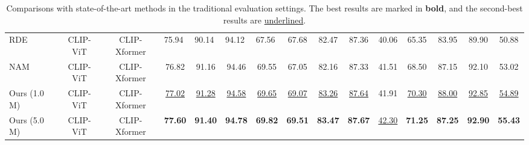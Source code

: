 \begin{table}[t!]
{\begin{tabular}{l|cc|cccc|cccc|cccc}
\multicolumn{1}{l|}{RDE \cite{qin2024noisy}} & CLIP-ViT & \multicolumn{1}{c|}{CLIP-Xformer} & \multicolumn{1}{l}{75.94} & \multicolumn{1}{l}{90.14} & \multicolumn{1}{l}{94.12} & \multicolumn{1}{l|}{67.56} & 67.68 & 82.47 & 87.36 & \multicolumn{1}{c|}{40.06} & 65.35 & 83.95 & 89.90 & 50.88 \\



NAM \cite{tan2024harnessing} & CLIP-ViT & CLIP-Xformer & 76.82 & 91.16 & 94.46 & 69.55 & 67.05 & 82.16 & 87.33 & 41.51 & 68.50 & 87.15 & 92.10 & 53.02 \\

Ours (1.0 M) & CLIP-ViT  & CLIP-Xformer & \underline{77.02} &\underline{91.28} &\underline{94.58} &\underline{69.65} &\underline{69.07} &\underline{83.26} &\underline{87.64} &41.91 &\underline{70.30} &\underline{88.00} &\underline{92.85}&\underline{54.89} \\

Ours (5.0 M) & CLIP-ViT  & CLIP-Xformer & \textbf{77.60} &\textbf{91.40} &\textbf{94.78} &\textbf{69.82} &\textbf{69.51} &\textbf{83.47} &\textbf{87.67} &\underline{42.30} &\textbf{71.25} &\textbf{87.25} &\textbf{92.90} &\textbf{55.43} \\
\bottomrule
\end{tabular}}
\vspace{-2mm}
\caption{Comparisons with state-of-the-art methods in the traditional evaluation settings. The best results are marked in \textbf{bold}, and the
second-best results are \underline{underlined}.}
\label{tab:sota-traditional}
\vspace{-5mm}
\end{table}